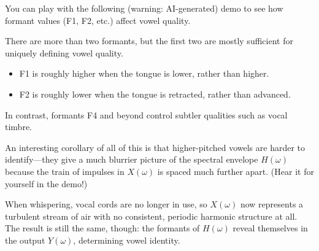 You can play with the following (warning: AI-generated)
demo to see how formant values (F1, F2, etc.) affect vowel quality.

\begin{center}
\end{center}

There are more than two formants,
but the first two are mostly sufficient
for uniquely defining vowel quality.
\begin{itemize}
    \item F1 is roughly higher when the tongue is lower,
    rather than higher.
    \item F2 is roughly lower when the tongue is retracted,
    rather than advanced.
\end{itemize}
In contrast, formants F4 and beyond
control subtler qualities such as vocal timbre.

An interesting corollary of all of this
is that higher-pitched vowels are harder to identify---they
give a much blurrier picture of the spectral envelope $H(\omega)$
because the train of impulses in $X(\omega)$ is spaced much further apart.
(Hear it for yourself in the demo!)

\begin{remark}
    When whispering, vocal cords are no longer in use,
    so $X(\omega)$ now represents a turbulent stream of air
    with no consistent, periodic harmonic structure at all.
    The result is still the same, though:
    the formants of $H(\omega)$ reveal themselves
    in the output $Y(\omega)$, determining vowel identity.
\end{remark}


